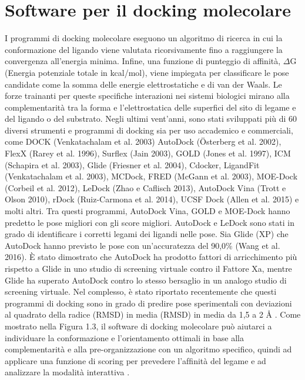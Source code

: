 \section{Software per il docking molecolare}
\def\baselinestretch{1.66}
\noindent I programmi di docking molecolare eseguono un algoritmo di ricerca in cui la conformazione del ligando viene valutata ricorsivamente fino a raggiungere la convergenza all'energia minima. Infine, una funzione di punteggio di affinità, $\Delta$G (Energia potenziale totale in kcal/mol), viene impiegata per classificare le pose candidate come la somma delle energie elettrostatiche e di van der Waals. Le forze trainanti per queste specifiche interazioni nei sistemi biologici mirano alla complementarità tra la forma e l'elettrostatica delle superfici del sito di legame e del ligando o del substrato. \newline
Negli ultimi vent'anni, sono stati sviluppati più di 60 diversi strumenti e programmi di docking sia per uso accademico e commerciali, come DOCK (Venkatachalam et al. 2003) AutoDock (Österberg et al. 2002), FlexX (Rarey et al. 1996), Surflex (Jain 2003), GOLD (Jones et al. 1997), ICM (Schapira et al. 2003), Glide (Friesner et al. 2004), Cdocker, LigandFit (Venkatachalam et al. 2003), MCDock, FRED (McGann et al. 2003), MOE-Dock (Corbeil et al. 2012), LeDock (Zhao e Caflisch 2013), AutoDock Vina (Trott e Olson 2010), rDock (Ruiz-Carmona et al. 2014), UCSF Dock (Allen et al. 2015) e molti altri. \newline 
Tra questi programmi, AutoDock Vina, GOLD e MOE-Dock hanno predetto le pose migliori con gli score migliori. AutoDock e LeDock sono stati in grado di identificare i corretti legami dei ligandi nelle pose. Sia Glide (XP) che AutoDock hanno previsto le pose con un'accuratezza del 90,0\% (Wang et al. 2016). È stato dimostrato che AutoDock ha prodotto fattori di arricchimento più rispetto a Glide in uno studio di screening virtuale contro il Fattore Xa, mentre Glide ha superato AutoDock contro lo stesso bersaglio in un analogo studio di screening virtuale. Nel complesso, è stato riportato recentemente che questi programmi di docking sono in grado di predire pose sperimentali con deviazioni al quadrato della radice (RMSD) in media (RMSD) in media da 1,5 a 2 Å \cite{pagadala2017software}.\newline 
Come mostrato nella Figura 1.3, il software di docking molecolare può aiutarci a individuare la conformazione e l'orientamento ottimali in base alla complementarità e alla pre-organizzazione con un algoritmo specifico, quindi ad applicare una funzione di scoring per prevedere l'afﬁnità del legame e ad analizzare la modalità interattiva \cite{fan2019progress}.


